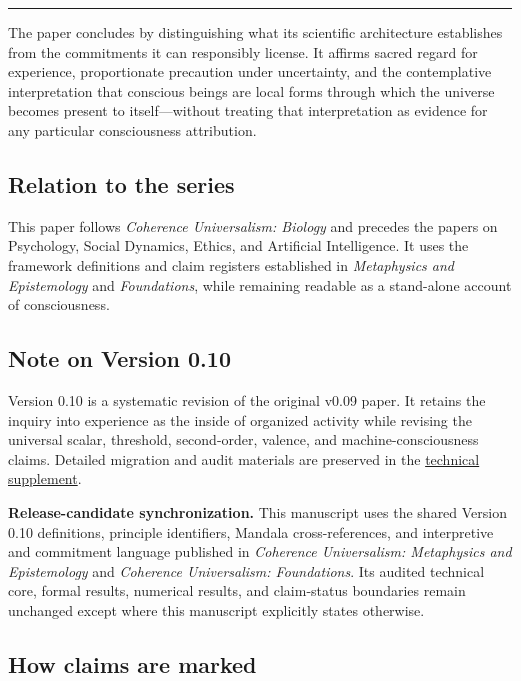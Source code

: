 \documentclass[
  11pt,
]{article}
\begin{document}
\begin{center}\rule{0.5\linewidth}{0.5pt}\end{center}

The paper concludes by distinguishing what its scientific architecture
establishes from the commitments it can responsibly license. It affirms
sacred regard for experience, proportionate precaution under
uncertainty, and the contemplative interpretation that conscious beings
are local forms through which the universe becomes present to
itself---without treating that interpretation as evidence for any
particular consciousness attribution.

\subsection{Relation to the series}\label{relation-to-the-series}

This paper follows \emph{Coherence Universalism: Biology} and precedes
the papers on Psychology, Social Dynamics, Ethics, and Artificial
Intelligence. It uses the framework definitions and claim registers
established in \emph{Metaphysics and Epistemology} and
\emph{Foundations}, while remaining readable as a stand-alone account of
consciousness.

\subsection{Note on Version 0.10}\label{note-on-version-0.10}

Version 0.10 is a systematic revision of the original v0.09 paper. It
retains the inquiry into experience as the inside of organized activity
while revising the universal scalar, threshold, second-order, valence,
and machine-consciousness claims. Detailed migration and audit materials
are preserved in the
\href{../supplements/05_Consciousness_Technical_Supplement_v0.10.md}{technical
supplement}.

\textbf{Release-candidate synchronization.} This manuscript uses the
shared Version 0.10 definitions, principle identifiers, Mandala
cross-references, and interpretive and commitment language published in
\emph{Coherence Universalism: Metaphysics and Epistemology} and
\emph{Coherence Universalism: Foundations}. Its audited technical core,
formal results, numerical results, and claim-status boundaries remain
unchanged except where this manuscript explicitly states otherwise.

\subsection{How claims are marked}\label{how-claims-are-marked}
\end{document}
